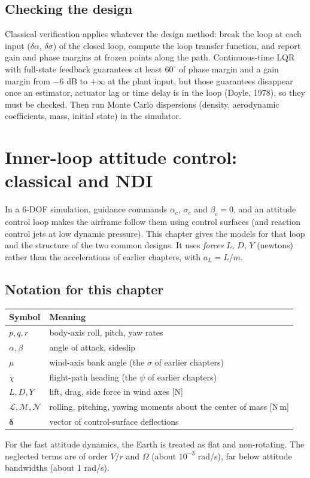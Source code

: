 \documentclass[11pt]{report}
\numberwithin{equation}{chapter}
\newcommand{\vb}[1]{\bm{#1}}
\newcommand{\aL}{a_L}
\begin{document}
\section{Checking the design}

Classical verification applies whatever the design method: break the loop at each input
($\delta\alpha$, $\delta\sigma$) of the closed loop, compute the loop transfer function, and report gain and
phase margins at frozen points along the path. Continuous-time LQR with full-state feedback
guarantees at least $60^\circ$ of phase margin and a gain margin from $-6$ dB to $+\infty$ at
the plant input, but those guarantees disappear once an estimator, actuator lag or time delay
is in the loop (Doyle, 1978), so they must be checked. Then run Monte Carlo dispersions
(density, aerodynamic coefficients, mass, initial state) in the simulator.

\chapter{Inner-loop attitude control: classical and NDI}\label{ch:inner}

In a 6-DOF simulation, guidance commands $\alpha_c$, $\sigma_c$ and $\beta_c = 0$, and an
attitude control loop makes the airframe follow them using control surfaces (and reaction
control jets at low dynamic pressure). This chapter gives the models for that loop and the
structure of the two common designs. It uses \emph{forces} $L$, $D$, $Y$ (newtons) rather than
the accelerations of earlier chapters, with $\aL = L/m$.

\section{Notation for this chapter}

\begin{center}
\begin{tabular}{@{}ll@{}}
\toprule
Symbol & Meaning \\
\midrule
$p, q, r$ & body-axis roll, pitch, yaw rates \\
$\alpha, \beta$ & angle of attack, sideslip \\
$\mu$ & wind-axis bank angle (the $\sigma$ of earlier chapters) \\
$\chi$ & flight-path heading (the $\psi$ of earlier chapters) \\
$L, D, Y$ & lift, drag, side force in wind axes [N] \\
$\mathcal L, \mathcal M, \mathcal N$ & rolling, pitching, yawing moments about the center of mass [N\,m] \\
$\vb\delta$ & vector of control-surface deflections \\
\bottomrule
\end{tabular}
\end{center}
For the fast attitude dynamics, the Earth is treated as flat and non-rotating. The neglected
terms are of order $V/r$ and $\Omega$ (about $10^{-3}$ rad/s), far below attitude bandwidths
(about 1 rad/s).
\end{document}
